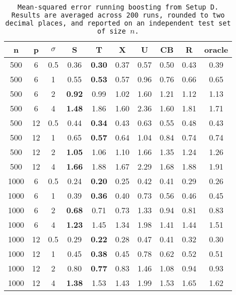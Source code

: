 \begin{table}[ht]
\centering
\begin{tabular}{cccccccccc}
  \hline
n & p & $\sigma$ & S & T & X & U & CB & R & oracle \\ 
  \hline
500 & 6 & 0.5 & 0.36 & \bf 0.30 & 0.37 & 0.57 & 0.50 & 0.43 & 0.39 \\ 
  500 & 6 & 1 & 0.55 & \bf 0.53 & 0.57 & 0.96 & 0.76 & 0.66 & 0.65 \\ 
  500 & 6 & 2 & \bf 0.92 & 0.99 & 1.02 & 1.60 & 1.21 & 1.12 & 1.13 \\ 
  500 & 6 & 4 & \bf 1.48 & 1.86 & 1.60 & 2.36 & 1.60 & 1.81 & 1.71 \\ 
  500 & 12 & 0.5 & 0.44 & \bf 0.34 & 0.43 & 0.63 & 0.55 & 0.48 & 0.43 \\ 
  500 & 12 & 1 & 0.65 & \bf 0.57 & 0.64 & 1.04 & 0.84 & 0.74 & 0.74 \\ 
  500 & 12 & 2 & \bf 1.05 & 1.06 & 1.10 & 1.66 & 1.35 & 1.24 & 1.26 \\ 
  500 & 12 & 4 & \bf 1.66 & 1.88 & 1.67 & 2.29 & 1.68 & 1.88 & 1.91 \\ 
  1000 & 6 & 0.5 & 0.24 & \bf 0.20 & 0.25 & 0.42 & 0.41 & 0.29 & 0.26 \\ 
  1000 & 6 & 1 & 0.39 & \bf 0.36 & 0.40 & 0.73 & 0.56 & 0.46 & 0.45 \\ 
  1000 & 6 & 2 & \bf 0.68 & 0.71 & 0.73 & 1.33 & 0.94 & 0.81 & 0.83 \\ 
  1000 & 6 & 4 & \bf 1.23 & 1.45 & 1.34 & 1.98 & 1.41 & 1.44 & 1.51 \\ 
  1000 & 12 & 0.5 & 0.29 & \bf 0.22 & 0.28 & 0.47 & 0.41 & 0.32 & 0.30 \\ 
  1000 & 12 & 1 & 0.45 & \bf 0.38 & 0.45 & 0.78 & 0.62 & 0.52 & 0.51 \\ 
  1000 & 12 & 2 & 0.80 & \bf 0.77 & 0.83 & 1.46 & 1.08 & 0.94 & 0.93 \\ 
  1000 & 12 & 4 & \bf 1.38 & 1.53 & 1.43 & 1.99 & 1.53 & 1.65 & 1.62 \\ 
   \hline
\end{tabular}
\caption{\tt Mean-squared error running \texttt{boosting} from Setup D. Results are averaged across 200 runs, rounded to two decimal places, and reported on an independent test set of size $n$.} 
\label{table:setup4}
\end{table}
